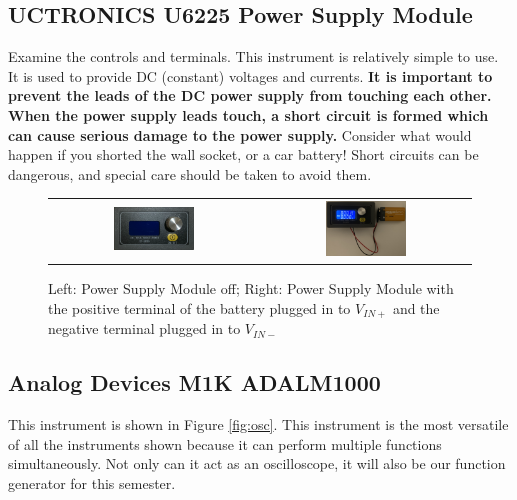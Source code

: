 \documentclass[12pt]{../manual}
\begin{document}
\subsection{UCTRONICS U6225 Power Supply Module}
Examine the controls and terminals. This instrument is relatively simple to use. It is used to provide DC (constant) voltages and currents. \textbf{It is important to prevent the leads of the DC power supply from touching each other. When the power supply leads touch, a short circuit is formed which can cause serious damage to the power supply.} Consider what would happen if you shorted the wall socket, or a car battery! Short circuits can be dangerous, and special care should be taken to avoid them.

\begin{figure}[ht!]
\centering
\begin{tabular}{cc}
\includegraphics[width=0.4\textwidth]{figures/powerConverterModuleOff.png} & 
\includegraphics[width=0.4\textwidth]{figures/powerConverterModule.png}
\end{tabular}
\caption[UCTRONICS U6225 Power Supply Module]{Left: Power Supply Module off; Right: Power Supply Module with the positive terminal of the battery plugged in to $V_{IN+}$ and the negative terminal plugged in to $V_{IN-}$}
\label{fig:powerSupply}
\end{figure}

\subsection{Analog Devices M1K ADALM1000}
This instrument is shown in Figure \ref{fig:osc}. This instrument is the most versatile of all the instruments shown because it can perform multiple functions simultaneously. Not only can it act as an oscilloscope, it will also be our function generator for this semester.
\end{document}

